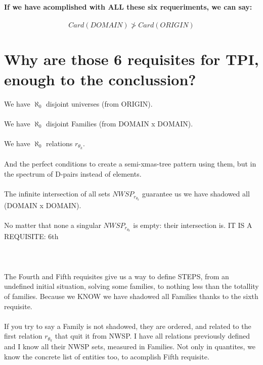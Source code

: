 		\noindent
		\textbf{If we have acomplished with ALL these six requeriments, we can say:}\\\\
		$$ Card(DOMAIN) \ngtr Card(ORIGIN) $$
		
	\newpage
	\section{Why are those 6 requisites for TPI, enough to the conclussion?}
	
		\noindent
		We have $\aleph_{0}$ disjoint universes (from ORIGIN).\\\\
		We have $\aleph_{0}$ disjoint Families  (from DOMAIN x DOMAIN).\\\\
		We have $\aleph_{0}$ relations $r_{\theta_{k}}$.\\\\
		And the perfect conditions to create a semi-xmas-tree pattern using them, but in the spectrum of D-pairs instead of elements.
		\\\\
		
		\noindent
		The infinite intersection of all sets $NWSP_{r_{\theta_{k}}}$ guarantee us we have shadowed all (DOMAIN x DOMAIN).\\\\
		No matter that none a singular $NWSP_{r_{\theta_{k}}}$ is empty: their intersection is. IT IS A REQUISITE: 6th\\\\
		\\\\
		
		\noindent
		The Fourth and Fifth requisites give us a way to define STEPS, from an undefined initial situation, solving some families, to nothing less than the totallity of families. Because we KNOW we have shadowed all Families thanks to the sixth requisite.\\\\
		If you try to say a Family is not shadowed, they are ordered, and related to the first relation $r_{\theta_{k}}$ that quit it from NWSP. I have all relations previously defined and I know all their NWSP sets, measured in Families. Not only in quantites, we know the concrete list of entities too, to acomplish Fifth requisite.\\\\
		\\\\
		
